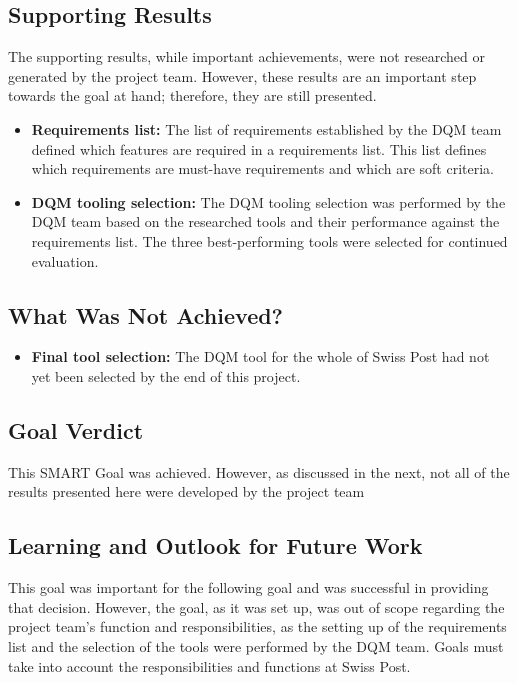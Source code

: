 \subsection*{Supporting Results}

The supporting results, while important achievements, were not researched or generated by the project team. However, these results are an important step towards the goal at hand; therefore, they are still presented.

\begin{itemize}
\item \textbf{Requirements list:} The list of requirements established by the DQM team defined which features are required in a requirements list. This list defines which requirements are must-have requirements and which are soft criteria.

\item \textbf{DQM tooling selection:} The DQM tooling selection was performed by the DQM team based on the researched tools and their performance against the requirements list. The three best-performing tools were selected for continued evaluation.

\end{itemize}




\subsection*{What Was Not Achieved?}

\begin{itemize}
    
\item \textbf{Final tool selection:} The DQM tool for the whole of Swiss Post had not yet been selected by the end of this project.

\end{itemize}

\subsection*{Goal Verdict}

This SMART Goal was achieved. However, as discussed in the next, not all of the results presented here were developed by the project team


\subsection*{Learning and Outlook for Future Work}

This goal was important for the following goal and was successful in providing that decision. However, the goal, as it was set up, was out of scope regarding the project team's function and responsibilities, as the setting up of the requirements list and the selection of the tools were performed by the DQM team. Goals must take into account the responsibilities and functions at Swiss Post.